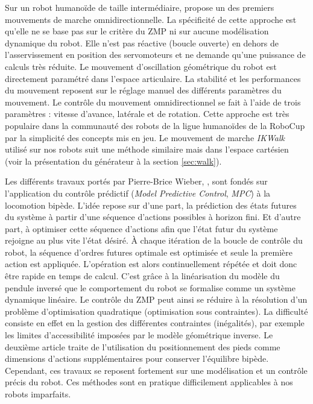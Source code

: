 Sur un robot humanoïde de taille intermédiaire, 
\cite{behnke_online_2006} propose un des premiers mouvements 
de marche omnidirectionnelle.
La spécificité de cette approche est qu'elle ne se base pas 
sur le critère du ZMP ni sur aucune modélisation dynamique du robot.
Elle n'est pas réactive (boucle ouverte) en dehors de l'asservissement en
position des servomoteurs et ne demande qu'une puissance de calculs très réduite.
Le mouvement d'oscillation géométrique du robot est directement paramétré 
dans l'espace articulaire.
La stabilité et les performances du mouvement reposent sur le réglage
manuel des différents paramètres du mouvement.
Le contrôle du mouvement omnidirectionnel se fait à l'aide 
de trois paramètres : vitesse d'avance, latérale et de rotation.
Cette approche est très populaire dans la communauté des robots de la
ligue humanoïdes de la RoboCup par la simplicité des concepts mis en jeu.
Le mouvement de marche \textit{IKWalk} utilisé sur nos robots suit
une méthode similaire mais dans l'espace cartésien
(voir la présentation du générateur à la section \ref{sec:walk}).

Les différents travaux portés par Pierre-Brice Wieber, 
\cite{wieber_trajectory_2006}, \cite{diedam_online_2008}
sont fondés sur l'application du contrôle prédictif 
(\textit{Model Predictive Control}, \textit{MPC}) à la locomotion bipède.
L'idée repose sur d'une part, la prédiction des états 
futures du système à partir d'une séquence d'actions possibles à horizon fini.
Et d'autre part, à optimiser cette séquence d'actions afin que l'état futur 
du système rejoigne au plus vite l'état désiré.
À chaque itération de la boucle de contrôle du robot, 
la séquence d'ordres futures optimale est optimisée et 
seule la première action est appliquée.
L'opération est alors continuellement répétée et doit
donc être rapide en temps de calcul.
C'est grâce à la linéarisation du modèle du pendule inversé
que le comportement du robot se formalise comme un système dynamique linéaire.
Le contrôle du ZMP peut ainsi se réduire à la résolution d'un problème 
d'optimisation quadratique (optimisation sous contraintes).
La difficulté consiste en effet en la gestion des différentes
contraintes (inégalités), par exemple les limites d'accessibilité 
imposées par le modèle géométrique inverse.
Le deuxième article traite de l'utilisation du positionnement 
des pieds comme dimensions d'actions supplémentaires
pour conserver l'équilibre bipède.
Cependant, ces travaux se reposent fortement sur une modélisation
et un contrôle précis du robot.
Ces méthodes sont en pratique difficilement applicables à nos robots imparfaits.


